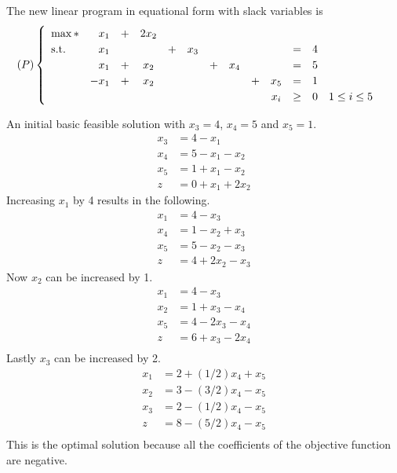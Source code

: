 \documentclass[11pt, oneside]{article}
\begin{document}
\begin{enumerate}
    The new linear program in equational form with slack variables is
    \[
      (P)
      \begin{cases}
        \begin{array}{lr*{11}c}
          \max*        & x_1  &+ &2x_2  &  &    &  &     &  &    &    &  & \\
          \text{s.t.} & x_1  &  &      &+ &x_3 &  &     &  &    &=   &4 & \\
                      & x_1  &+ &x_2   &  &    &+ &x_4  &  &    &=   &5 & \\
                      & -x_1 &+ &x_2   &  &    &  &     &+ &x_5 &=   &1 & \\
                      &      &  &      &  &    &  &     &  &x_i &\ge &0 &1 \le i \le 5 \\
        \end{array}
      \end{cases}
    \]

    An initial basic feasible solution with $x_3 = 4$, $x_4 = 5$ and $x_5 = 1$.
    \begin{align*}
      x_3 &= 4 - x_1 \\
      x_4 &= 5 - x_1 - x_2 \\
      x_5 &= 1 + x_1 - x_2 \\
      z   &= 0 + x_1 + 2x_2
    \end{align*}
    Increasing $x_1$ by 4 results in the following.
    \begin{align*}
      x_1 &= 4 - x_3 \\
      x_4 &= 1 - x_2 + x_3 \\
      x_5 &= 5 - x_2 - x_3 \\
      z   &= 4 + 2x_2 - x_3
    \end{align*}
    Now $x_2$ can be increased by 1.
    \begin{align*}
      x_1 &= 4 - x_3 \\
      x_2 &= 1 + x_3 - x_4 \\
      x_5 &= 4 - 2x_3 - x_4  \\
      z   &= 6 + x_3 - 2x_4 \\
    \end{align*}
    Lastly $x_3$ can be increased by 2.
    \begin{align*}
      x_1 &= 2 + (1/2)x_4 + x_5 \\
      x_2 &= 3 -(3/2)x_4 - x_5 \\
      x_3 &= 2 -(1/2)x_4 - x_5 \\
      z   &= 8 - (5/2)x_4 - x_5 \\
    \end{align*}
    This is the optimal solution because all the coefficients of the objective
    function are negative.


\end{enumerate}
\end{document}
